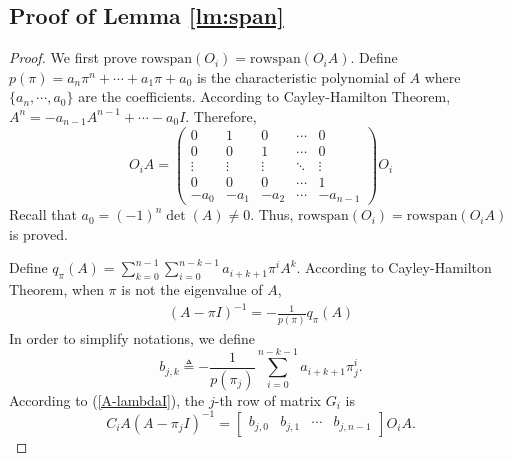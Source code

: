 \documentclass[journal]{IEEEtran}
\newcommand{\rs}{\text{rowspan}}
\newtheorem*{proof}{\textbf{Proof}}
\begin{document}
	\subsection{Proof of Lemma \ref{lm:span}}
	\begin{proof}
		We first prove $\rs(O_i)=\rs(O_i A)$. Define $p(\pi)=a_n \pi^n +\cdots+a_1 \pi +a_0$ is the characteristic polynomial of $A$ where $\{a_n,\cdots,a_0\}$ are the coefficients. 
		According to Cayley-Hamilton Theorem, $A^n=-a_{n-1}A^{n-1}+\cdots-a_0 I$. Therefore, 
		$$
		O_i A=
		\begin{pmatrix}
			0 & 1 & 0 &  \cdots & 0 \\
			0 & 0 & 1 &  \cdots & 0 \\
			\vdots & \vdots & \vdots & \ddots & \vdots \\
			0 & 0 & 0 &  \cdots & 1 \\
			-a_0 & -a_1 & -a_2 & \cdots &  -a_{n-1}
		\end{pmatrix}
		O_i
		$$
		Recall that $a_0=(-1)^n\det(A)\neq 0$. Thus, $\rs(O_i)=\rs(O_i A)$ is proved.
		
		Define $q_\pi(A)=\sum_{k=0}^{n-1} \sum_{i=0}^{n-k-1} a_{i+k+1} \pi^i A^k$. According to Cayley-Hamilton Theorem, when $\pi$ is not the eigenvalue of $A$,
		\begin{align}\label{A-lambdaI}
			(A-\pi I)^{-1}=-\frac{1}{p(\pi)} q_\pi(A)
		\end{align}
		In order to simplify notations, we define 
		\begin{equation}\label{eq:bjk}
			b_{j,k}\triangleq-\frac{1}{p(\pi_j)}\sum_{i=0}^{n-k-1} a_{i+k+1} \pi_j^i.
		\end{equation}
		According to (\ref{A-lambdaI}), the $j$-th row of matrix $G_i$ is
		$$C_{i} A\left(A-\pi_{j} I\right)^{-1}=
		\begin{bmatrix}
			b_{j,0} & b_{j,1} & \cdots  & b_{j,n-1} 
		\end{bmatrix} O_i A.$$
		

\end{proof}
\end{document}
